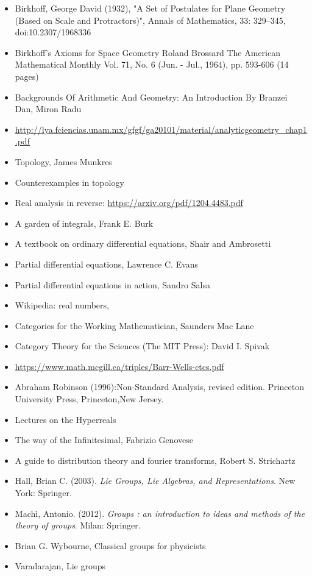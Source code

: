 \documentclass{report}
\begin{document}
\begin{itemize}
\item Birkhoff, George David (1932), "A Set of Postulates for Plane Geometry (Based on Scale and Protractors)", Annals of Mathematics, 33: 329–345, doi:10.2307/1968336
\item Birkhoff's Axioms for Space Geometry
Roland Brossard
The American Mathematical Monthly
Vol. 71, No. 6 (Jun. - Jul., 1964), pp. 593-606 (14 pages)
\item Backgrounds Of Arithmetic And Geometry: An Introduction
By Branzei Dan, Miron Radu
\item \url{http://lya.fciencias.unam.mx/gfgf/ga20101/material/analyticgeometry_chap1.pdf}
\item Topology, James Munkres
\item Counterexamples in topology
\item Real analysis in reverse: \url{https://arxiv.org/pdf/1204.4483.pdf}
\item A garden of integrals, Frank E. Burk
\item A textbook on ordinary differential equations, Shair and Ambrosetti
\item Partial differential equations, Lawrence C. Evans
\item Partial differential equations in action, Sandro Salsa
\item Wikipedia: real numbers,
\item Categories for the Working Mathematician, Saunders Mac Lane
\item Category Theory for the Sciences (The MIT Press): David I. Spivak
\item \url{https://www.math.mcgill.ca/triples/Barr-Wells-ctcs.pdf}
\item Abraham Robinson (1996):Non-Standard Analysis, revised edition. Princeton University Press, Princeton,New Jersey.
\item Lectures on the Hyperreals
\item The way of the Infinitesimal, Fabrizio Genovese
\item A guide to distribution theory and fourier transforms, Robert S. Strichartz
\item Hall, Brian C. (2003). \textit{Lie Groups, Lie Algebras, and Representations}. New York: Springer.
\item Machì, Antonio. (2012). \textit{Groups : an introduction to ideas and methods of the theory of groups}. Milan: Springer.
\item Brian G. Wybourne, Classical groups for physicists
\item Varadarajan, Lie groups

\end{itemize}
\end{document}
